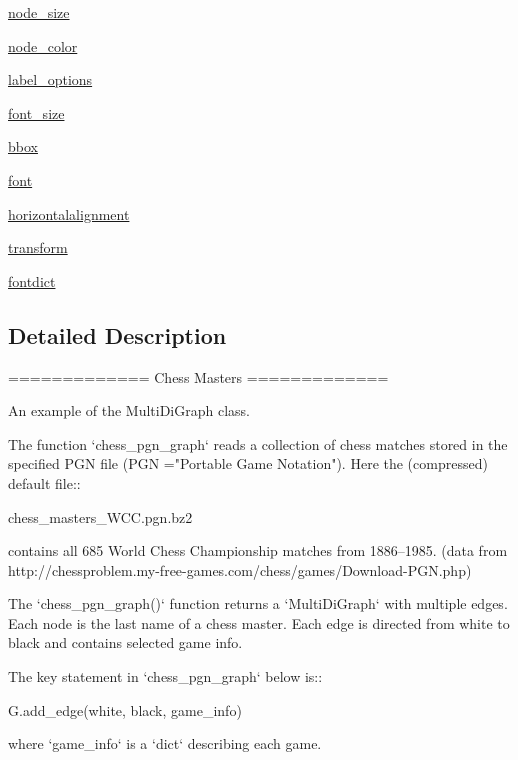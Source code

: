 \begin{DoxyCompactItemize}
\item 
\hyperlink{namespaceplot__chess__masters_a76c7509572b6618091e9240725c74194}{node\+\_\+size}
\item 
\hyperlink{namespaceplot__chess__masters_aae032c5ad84a74292862a4071ce7a86a}{node\+\_\+color}
\item 
\hyperlink{namespaceplot__chess__masters_a4ea667f5e9d3769016c179ab377f61b2}{label\+\_\+options}
\item 
\hyperlink{namespaceplot__chess__masters_a2a864018b024c476b67eacaf887b6145}{font\+\_\+size}
\item 
\hyperlink{namespaceplot__chess__masters_a734bc1049d83031c90e87bbd811cfb2d}{bbox}
\item 
\hyperlink{namespaceplot__chess__masters_a5c886436f8a90c2982dbf09464b6d00f}{font}
\item 
\hyperlink{namespaceplot__chess__masters_a8852f68f96e472fccc7e571c4a3c5e40}{horizontalalignment}
\item 
\hyperlink{namespaceplot__chess__masters_abf17e843ddf30122963d57ffc9160066}{transform}
\item 
\hyperlink{namespaceplot__chess__masters_a5d139ff0a14cb0c6fdadc0b4cbf88bed}{fontdict}
\end{DoxyCompactItemize}


\subsection{Detailed Description}
\begin{DoxyVerb}=============
Chess Masters
=============

An example of the MultiDiGraph class.

The function `chess_pgn_graph` reads a collection of chess matches stored in
the specified PGN file (PGN ="Portable Game Notation").  Here the (compressed)
default file::

chess_masters_WCC.pgn.bz2

contains all 685 World Chess Championship matches from 1886--1985.
(data from http://chessproblem.my-free-games.com/chess/games/Download-PGN.php)

The `chess_pgn_graph()` function returns a `MultiDiGraph` with multiple edges.
Each node is the last name of a chess master. Each edge is directed from white
to black and contains selected game info.

The key statement in `chess_pgn_graph` below is::

G.add_edge(white, black, game_info)

where `game_info` is a `dict` describing each game.
\end{DoxyVerb}
 

